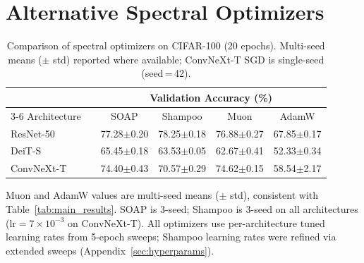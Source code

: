 \section{Alternative Spectral Optimizers}\label{sec:alt_spectral}

\begin{table}[h]
\centering
\caption{Comparison of spectral optimizers on CIFAR-100 (20 epochs). Multi-seed means ($\pm$ std) reported where available; ConvNeXt-T SGD is single-seed (seed\,=\,42).}
\label{tab:spectral_comparison}
\small
\begin{tabular}{llcccc}
\toprule
 & & \multicolumn{4}{c}{Validation Accuracy (\%)} \\
\cmidrule(lr){3-6}
Architecture & & SOAP & Shampoo & Muon & AdamW \\
\midrule
ResNet-50  & & 77.28{\scriptsize$\pm$0.20} & 78.25{\scriptsize$\pm$0.18} & 76.88{\scriptsize$\pm$0.27} & 67.85{\scriptsize$\pm$0.17} \\
DeiT-S     & & 65.45{\scriptsize$\pm$0.18} & 63.53{\scriptsize$\pm$0.05} & 62.67{\scriptsize$\pm$0.41} & 52.33{\scriptsize$\pm$0.34} \\
ConvNeXt-T & & 74.40{\scriptsize$\pm$0.43} & 70.57{\scriptsize$\pm$0.29} & 74.62{\scriptsize$\pm$0.15} & 58.54{\scriptsize$\pm$2.17} \\
\bottomrule
\end{tabular}
\vspace{0.3em}
\par\noindent\footnotesize{Muon and AdamW values are multi-seed means ($\pm$ std), consistent with Table~\ref{tab:main_results}. SOAP is 3-seed; Shampoo is 3-seed on all architectures ($\text{lr}{=}7{\times}10^{-3}$ on ConvNeXt-T). All optimizers use per-architecture tuned learning rates from 5-epoch sweeps; Shampoo learning rates were refined via extended sweeps (Appendix~\ref{sec:hyperparams}).}
\end{table}

